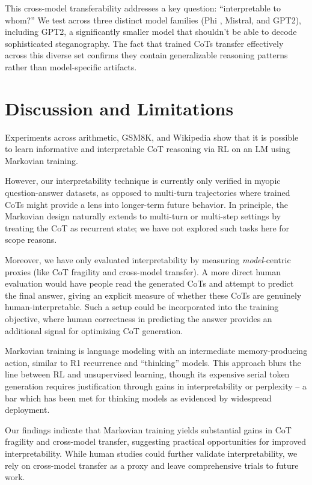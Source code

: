 \documentclass{article} %
\begin{document}
This cross-model transferability addresses a key question: ``interpretable to whom?'' We test across three distinct model families (Phi \citep{abdin2024phi3technicalreporthighly}, Mistral, and GPT2), including GPT2, a significantly smaller model that shouldn't be able to decode sophisticated steganography. The fact that trained CoTs transfer effectively across this diverse set confirms they contain generalizable reasoning patterns rather than model-specific artifacts.

\section{Discussion and Limitations}
\label{sec:disc}

Experiments across arithmetic, GSM8K, and Wikipedia show that it is possible to learn informative and interpretable CoT reasoning via RL on an LM using Markovian training.

However, our interpretability technique is currently only verified in myopic question-answer datasets, as opposed to multi-turn trajectories where trained CoTs might provide a lens into longer-term future behavior. In principle, the Markovian design naturally extends to multi-turn or multi-step settings by treating the CoT as recurrent state; we have not explored such tasks here for scope reasons.

Moreover, we have only evaluated interpretability by measuring \emph{model}-centric proxies (like CoT fragility and cross-model transfer). A more direct human evaluation would have people read the generated CoTs and attempt to predict the final answer, giving an explicit measure of whether these CoTs are genuinely human-interpretable. Such a setup could be incorporated into the training objective, where human correctness in predicting the answer provides an additional signal for optimizing CoT generation.

Markovian training is language modeling with an intermediate memory-producing action, similar to R1 recurrence and ``thinking'' models. This approach blurs the line between RL and unsupervised learning, though its expensive serial token generation requires justification through gains in interpretability or perplexity -- a bar which has been met for thinking models as evidenced by widespread deployment.

Our findings indicate that Markovian training yields substantial gains in CoT fragility and cross-model transfer, suggesting practical opportunities for improved interpretability. While human studies could further validate interpretability, we rely on cross-model transfer as a proxy and leave comprehensive trials to future work.
\end{document}

